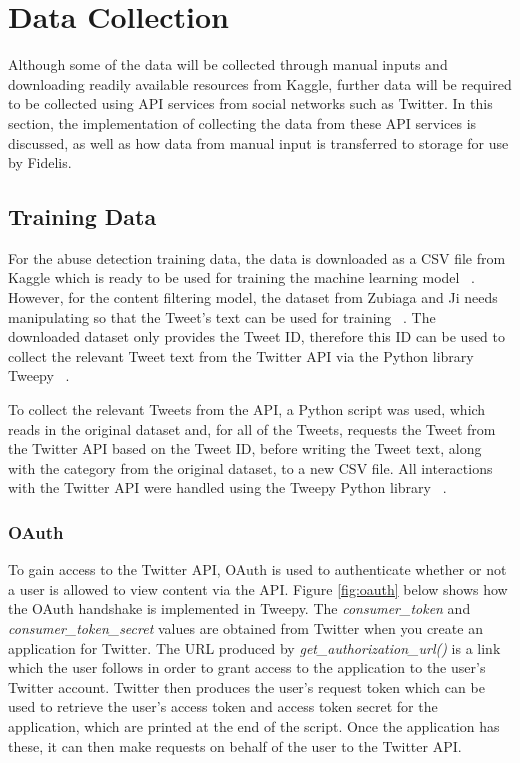 \section{Data Collection}
Although some of the data will be collected through manual inputs and downloading readily available resources from Kaggle, further data will be required to be collected using API services from social networks such as Twitter. In this section, the implementation of collecting the data from these API services is discussed, as well as how data from manual input is transferred to storage for use by Fidelis.

\subsection{Training Data}
For the abuse detection training data, the data is downloaded as a CSV file from Kaggle which is ready to be used for training the machine learning model ~\cite{Kaggle:Dataset}. However, for the content filtering model, the dataset from Zubiaga and Ji needs manipulating so that the Tweet's text can be used for training ~\cite{Zubiaga:Tweets}. The downloaded dataset only provides the Tweet ID, therefore this ID can be used to collect the relevant Tweet text from the Twitter API via the Python library Tweepy ~\cite{Tweepy}.

To collect the relevant Tweets from the API, a Python script was used, which reads in the original dataset and, for all of the Tweets, requests the Tweet from the Twitter API based on the Tweet ID, before writing the Tweet text, along with the category from the original dataset, to a new CSV file. All interactions with the Twitter API were handled using the Tweepy Python library ~\cite{Tweepy}. 

\subsubsection{OAuth}
To gain access to the Twitter API, OAuth is used to authenticate whether or not a user is allowed to view content via the API. Figure \ref{fig:oauth} below shows how the OAuth handshake is implemented in Tweepy. The \textit{consumer\_token} and \textit{consumer\_token\_secret} values are obtained from Twitter when you create an application for Twitter. The URL produced by \textit{get\_authorization\_url()} is a link which the user follows in order to grant access to the application to the user's Twitter account. Twitter then produces the user's request token which can be used to retrieve the user's access token and access token secret for the application, which are printed at the end of the script. Once the application has these, it can then make requests on behalf of the user to the Twitter API.

